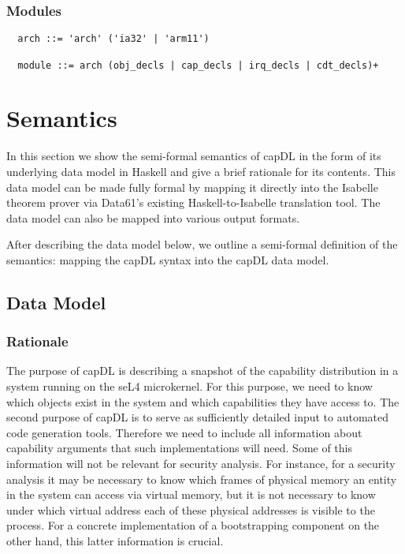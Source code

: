 \documentclass[a4paper,12pt]{article}
\begin{document}
\subsubsection{Modules}\label{sec:capDL:syntax:module}

\begin{verbatim}
  arch ::= 'arch' ('ia32' | 'arm11') 

  module ::= arch (obj_decls | cap_decls | irq_decls | cdt_decls)+
\end{verbatim}


\section{Semantics}
\label{sec:capDL:semantics}

In this section we show the semi-formal semantics of capDL in the form of its underlying data model in Haskell and give a brief rationale for its contents. This data model can be made fully formal by mapping it directly into the Isabelle theorem prover via Data61's existing Haskell-to-Isabelle translation tool. The data model can also be mapped into various output formats.

After describing the data model below, we outline a semi-formal definition of the semantics: mapping the capDL syntax into the capDL data model.


\subsection{Data Model}

\subsubsection{Rationale}
The purpose of capDL is describing a snapshot of the capability distribution in 
a system running on the seL4 microkernel. For this purpose, we need to know 
which objects exist in the system and which capabilities they have access to. 
The second purpose of capDL is to serve as sufficiently detailed input to 
automated code generation tools. Therefore we need to include all information 
about capability arguments that such implementations will need. Some of this 
information will not be relevant for security analysis. For instance, for a 
security analysis it may be necessary to know which frames of physical memory 
an entity in the system can access via virtual memory, but it is not necessary 
to know under which virtual address each of these physical addresses is visible 
to the process. For a concrete implementation of a bootstrapping component on 
the other hand, this latter information is crucial.
\end{document}
